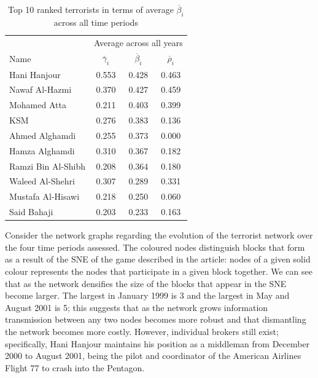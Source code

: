 \begin{table}[t]
\begin{center}
\begin{tabular}{lccc}
\toprule
 & \multicolumn{3}{c}{Average across all years} \\[1ex]
Name & $\overline{\gamma}_{i}$ & $\overline{\beta}_{i}$ & $\overline{\rho}_{i}$\\
\midrule
Hani Hanjour           &0.553	               &0.428	            &0.463	\\
Nawaf Al-Hazmi         &0.370	               &0.427	            &0.459	\\
Mohamed Atta           &0.211	               &0.403	            &0.399	\\
KSM                    &0.276	               &0.383	            &0.136	\\
Ahmed Alghamdi         &0.255	               &0.373	            &0.000	\\
Hamza Alghamdi         &0.310	               &0.367	            &0.182	\\
Ramzi Bin Al-Shibh     &0.208	               &0.364	            &0.180	\\
Waleed Al-Shehri       &0.307	               &0.289	            &0.331	\\
Mustafa Al-Hisawi      &0.218	               &0.250	            &0.060	\\
Said Bahaji            &0.203	               &0.233	            &0.163	\\
\bottomrule
\end{tabular}
\end{center}
\caption{Top 10 ranked terrorists in terms of average $\overline{\beta}_{i}$ across all time periods}
\label{criticalterrorists}
\end{table}

Consider the network graphs regarding the evolution of the terrorist network over the four time periods assessed. The coloured nodes distinguish blocks that form as a result of the SNE of the game described in the article: nodes of a given solid colour represents the nodes that participate in a given block together. We can see that as the network densifies the size of the blocks that appear in the SNE become larger. The largest in January 1999 is 3 and the largest in May and August 2001 is 5; this suggests that as the network grows information transmission between any two nodes becomes more robust and that dismantling the network becomes more costly. However, individual brokers still exist; specifically, Hani Hanjour maintains his position as a middleman from December 2000 to August 2001, being the pilot and coordinator of the American Airlines Flight 77 to crash into the Pentagon.

